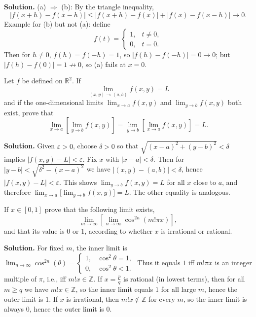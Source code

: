 \noindent\textbf{Solution.}
(a) $\Rightarrow$ (b): By the triangle inequality,
\[
|f(x+h)-f(x-h)|\le |f(x+h)-f(x)|+|f(x)-f(x-h)|\to 0.
\]
Example for (b) but not (a): define
\[
f(t)=\begin{cases}
1,& t\ne 0,\\
0,& t=0.
\end{cases}
\]
Then for $h\ne 0$, $f(h)=f(-h)=1$, so $|f(h)-f(-h)|=0\to 0$; but $|f(h)-f(0)|=1\not\to 0$, so (a) fails at $x=0$.
\medskip

\begin{problembox}
Let $f$ be defined on $\mathbb{R}^2$. If
\[\lim_{(x, y) \to (a, b)} f(x, y) = L\]
and if the one-dimensional limits $\lim_{x \to a} f(x, y)$ and $\lim_{y \to b} f(x, y)$ both exist, prove that
\[\lim_{x \to a} \left[ \lim_{y \to b} f(x, y) \right] = \lim_{y \to b} \left[ \lim_{x \to a} f(x, y) \right] = L.\]
\end{problembox}

\noindent\textbf{Solution.}
Given $\varepsilon>0$, choose $\delta>0$ so that $\sqrt{(x-a)^2+(y-b)^2}<\delta$ implies $|f(x,y)-L|<\varepsilon$. Fix $x$ with $|x-a|<\delta$. Then for $|y-b|<\sqrt{\delta^2-(x-a)^2}$ we have $|(x,y)-(a,b)|<\delta$, hence $|f(x,y)-L|<\varepsilon$. This shows $\lim_{y\to b}f(x,y)=L$ for all $x$ close to $a$, and therefore $\lim_{x\to a}\big[\lim_{y\to b}f(x,y)\big]=L$. The other equality is analogous.
\medskip


\begin{problembox}
If \( x \in [0, 1] \) prove that the following limit exists,
\[\lim_{m \to \infty} \left[ \lim_{n \to \infty} \cos^{2n} (m! \pi x) \right],\]
and that its value is 0 or 1, according to whether \( x \) is irrational or rational.
\end{problembox}

\noindent\textbf{Solution.}
For fixed $m$, the inner limit is $\lim_{n\to\infty}\cos^{2n}(\theta)=\begin{cases}1,& \cos^2\theta=1,\\ 0,& \cos^2\theta<1.\end{cases}$ Thus it equals $1$ iff $m!\pi x$ is an integer multiple of $\pi$, i.e., iff $m!x\in\mathbb{Z}$. If $x=\tfrac{p}{q}$ is rational (in lowest terms), then for all $m\ge q$ we have $m!x\in\mathbb{Z}$, so the inner limit equals $1$ for all large $m$, hence the outer limit is $1$. If $x$ is irrational, then $m!x\notin\mathbb{Z}$ for every $m$, so the inner limit is always $0$, hence the outer limit is $0$.
\medskip

